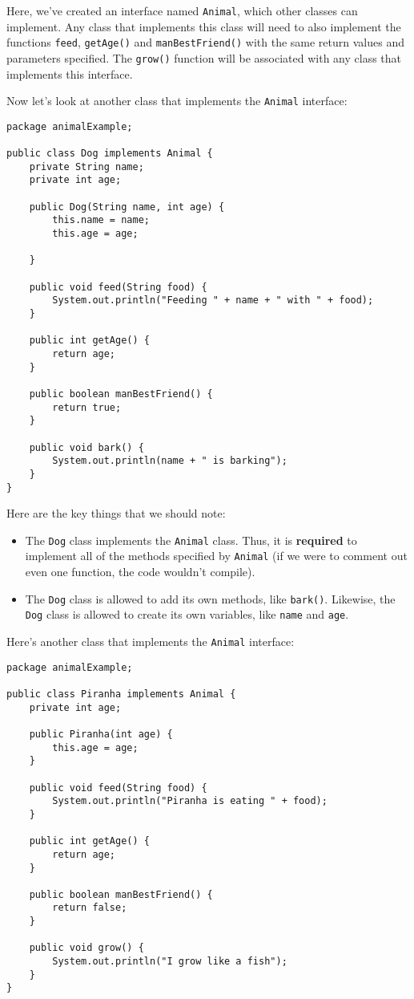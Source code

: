 Here, we've created an interface named \verb!Animal!, which other classes can implement. Any class that implements this class will need to also implement the functions \verb!feed!, \verb!getAge()! and \verb!manBestFriend()! with the same return values and parameters specified. The \verb!grow()! function will be associated with any class that implements this interface.

Now let's look at another class that implements the \verb!Animal! interface:

\begin{lstlisting}
package animalExample;

public class Dog implements Animal {
	private String name;
	private int age;

	public Dog(String name, int age) {
		this.name = name;
		this.age = age;

	}

	public void feed(String food) {
		System.out.println("Feeding " + name + " with " + food);
	}

	public int getAge() {
		return age;
	}

	public boolean manBestFriend() {
		return true;
	}

	public void bark() {
		System.out.println(name + " is barking");
	}
}
\end{lstlisting}

Here are the key things that we should note:
\begin{itemize}
    \item The \verb!Dog! class implements the \verb!Animal! class. Thus, it is \textbf{required} to implement all of the methods specified by \verb!Animal! (if we were to comment out even one function, the code wouldn't compile).
    \item The \verb!Dog! class is allowed to add its own methods, like \verb!bark()!. Likewise, the \verb!Dog! class is allowed to create its own variables, like \verb!name! and \verb!age!.
\end{itemize}

Here's another class that implements the \verb!Animal! interface:

\begin{lstlisting}
package animalExample;

public class Piranha implements Animal {
	private int age;

	public Piranha(int age) {
		this.age = age;
	}

	public void feed(String food) {
		System.out.println("Piranha is eating " + food);
	}

	public int getAge() {
		return age;
	}

	public boolean manBestFriend() {
		return false;
	}

	public void grow() {
		System.out.println("I grow like a fish");
	}
}
\end{lstlisting}

